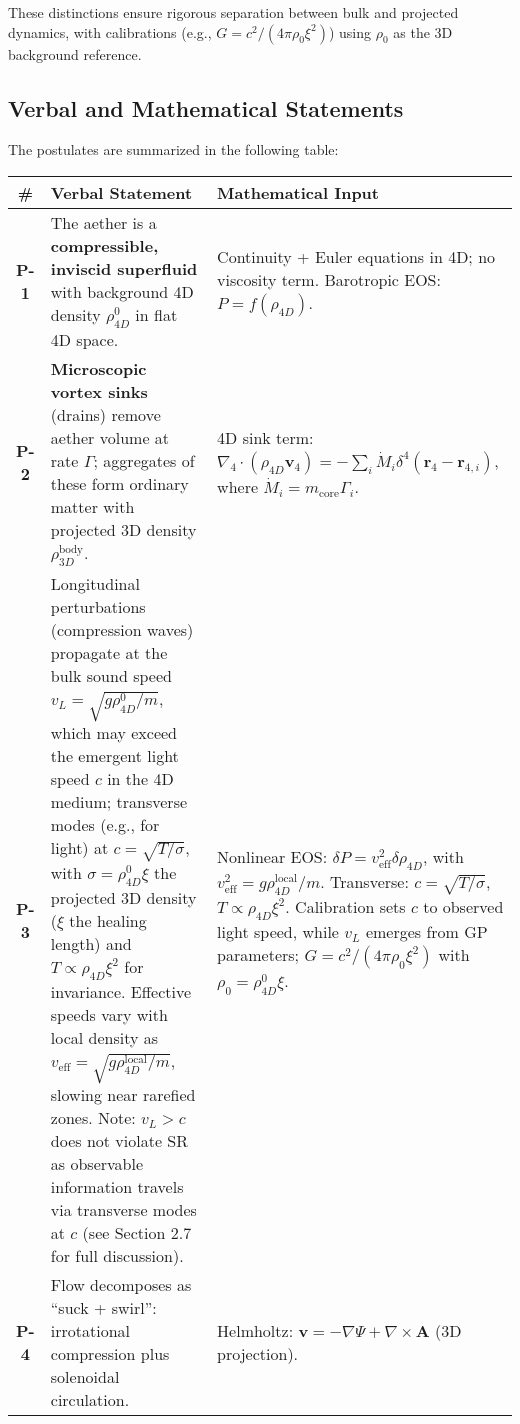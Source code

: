 \documentclass{article}
\begin{document}
These distinctions ensure rigorous separation between bulk and projected dynamics, with calibrations (e.g., $G = c^2 / (4\pi \rho_0 \xi^2)$) using $\rho_0$ as the 3D background reference.

\subsection{Verbal and Mathematical Statements}

The postulates are summarized in the following table:

\begin{table}[H]
\centering
\begin{tabularx}{\textwidth}{|c|Y|Y|}
\hline
\# & Verbal Statement & Mathematical Input \\
\hline
\textbf{P-1} & The aether is a \textbf{compressible, inviscid superfluid} with background 4D density $\rho_{4D}^0$ in flat 4D space. & Continuity + Euler equations in 4D; no viscosity term. Barotropic EOS: $P = f(\rho_{4D})$. \\
\hline
\textbf{P-2} & \textbf{Microscopic vortex sinks} (drains) remove aether volume at rate $\Gamma$; aggregates of these form ordinary matter with projected 3D density $\rho_{3D}^{\text{body}}$. & 4D sink term: $\nabla_4 \cdot (\rho_{4D} \mathbf{v}_4) = -\sum_i \dot{M}_i \delta^4(\mathbf{r}_4 - \mathbf{r}_{4,i})$, where $\dot{M}_i = m_{\text{core}} \Gamma_i$. \\
\hline
\textbf{P-3} & Longitudinal perturbations (compression waves) propagate at the bulk sound speed $v_L = \sqrt{g \rho_{4D}^0 / m}$, which may exceed the emergent light speed $c$ in the 4D medium; transverse modes (e.g., for light) at $c = \sqrt{T / \sigma}$, with $\sigma = \rho_{4D}^0 \xi$ the projected 3D density ($\xi$ the healing length) and $T \propto \rho_{4D} \xi^2$ for invariance. Effective speeds vary with local density as $v_{\text{eff}} = \sqrt{g \rho_{4D}^{\text{local}} / m}$, slowing near rarefied zones. Note: $v_L > c$ does not violate SR as observable information travels via transverse modes at $c$ (see Section 2.7 for full discussion). & Nonlinear EOS: $\delta P = v_{\text{eff}}^2 \delta \rho_{4D}$, with $v_{\text{eff}}^2 = g \rho_{4D}^{\text{local}} / m$. Transverse: $c = \sqrt{T / \sigma}$, $T \propto \rho_{4D} \xi^2$. Calibration sets $c$ to observed light speed, while $v_L$ emerges from GP parameters; $G = c^2 / (4\pi \rho_0 \xi^2)$ with $\rho_0 = \rho_{4D}^0 \xi$. \\
\hline
\textbf{P-4} & Flow decomposes as ``suck + swirl'': irrotational compression plus solenoidal circulation. & Helmholtz: $\mathbf{v} = -\nabla \Psi + \nabla \times \mathbf{A}$ (3D projection). \\

\end{tabularx}
\end{table}
\end{document}
